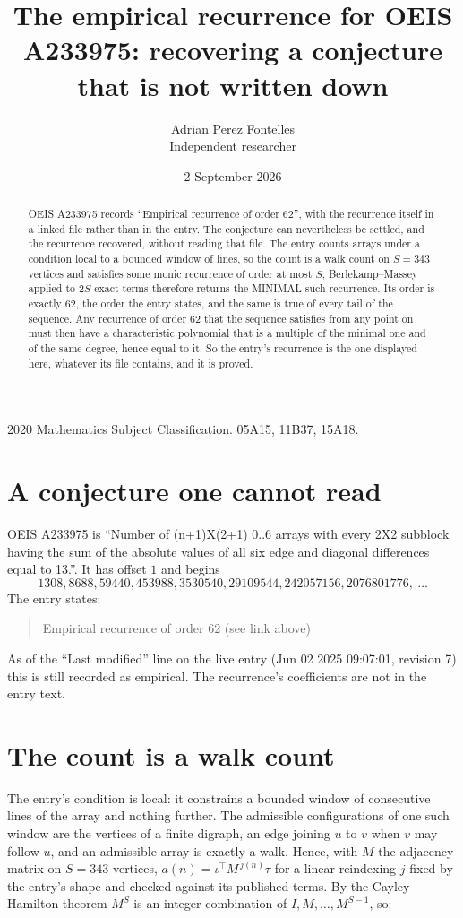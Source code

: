 \documentclass[11pt,a4paper]{article}
\title{The empirical recurrence for OEIS A233975: recovering a conjecture that is not written down}
\author{Adrian Perez Fontelles\\ \small Independent researcher}
\date{2 September 2026}
\theoremstyle{plain}
\theoremstyle{definition}
\begin{document}
\maketitle

\begin{abstract}
OEIS A233975 records ``Empirical recurrence of order $62$'', with the recurrence itself in a
linked file rather than in the entry. The conjecture can nevertheless be settled, and the
recurrence recovered, without reading that file. The entry counts arrays under a condition
local to a bounded window of lines, so the count is a walk count on $S=343$ vertices and
satisfies some monic recurrence of order at most $S$; Berlekamp--Massey applied to $2S$ exact
terms therefore returns the MINIMAL such recurrence. Its order is exactly $62$, the order
the entry states, and the same is true of every tail of the sequence. Any recurrence of order
$62$ that the sequence satisfies from any point on must then have a characteristic
polynomial that is a multiple of the minimal one and of the same degree, hence equal to it. So
the entry's recurrence is the one displayed here, whatever its file contains, and it is
proved.
\end{abstract}

\noindent\small 2020 Mathematics Subject Classification. 05A15, 11B37, 15A18.\normalsize

\section{A conjecture one cannot read}

OEIS A233975 is ``Number of (n+1)X(2+1) 0..6 arrays with every 2X2 subblock having the sum of the absolute values of all six edge and diagonal differences equal to 13.''. It has offset $1$ and begins
\[
1308, 8688, 59440, 453988, 3530540, 29109544, 242057156, 2076801776,\ \dots
\]
The entry states:
\begin{quote}
Empirical recurrence of order 62 (see link above)
\end{quote}
As of the ``Last modified'' line on the live entry (Jun 02 2025 09:07:01, revision 7) this is still
recorded as empirical. The recurrence's coefficients are not in the entry text.

\section{The count is a walk count}

The entry's condition is local: it constrains a bounded window of consecutive lines of the
array and nothing further. The admissible configurations of one such window are the vertices
of a finite digraph, an edge joining $u$ to $v$ when $v$ may follow $u$, and an admissible
array is exactly a walk. Hence, with $M$ the adjacency matrix on $S=343$ vertices,
$a(n)=\iota^{\!\top}M^{\,j(n)}\tau$ for a linear reindexing $j$ fixed by the entry's shape
and checked against its published terms. By the Cayley--Hamilton theorem $M^{S}$ is an
integer combination of $I,M,\dots,M^{S-1}$, so:
\end{document}
